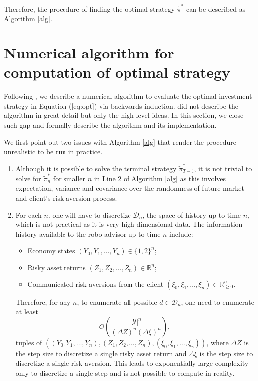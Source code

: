 Therefore, the procedure of finding the optimal strategy $\tilde\pi^*$ can be described as Algorithm \ref{alg}.

\section{Numerical algorithm for computation of optimal strategy}\label{sec:comp}
Following , we describe a numerical algorithm to evaluate the optimal investment strategy in Equation (\ref{eq:opt}) via backwards induction.  did not describe the algorithm in great detail but only the high-level ideas. In this section, we close such gap and formally describe the algorithm and its implementation.

We first point out two issues with Algorithm \ref{alg} that render the procedure unrealistic to be run in practice. \begin{enumerate}
    \item Although it is possible to solve the terminal strategy $\tilde\pi^*_{T-1}$, it is not trivial to solve for $\tilde\pi_n^*$ for smaller $n$ in Line 2 of Algorithm \ref{alg} as this involves expectation, variance and covariance over the randomness of future market and client's risk aversion process.
    \item For each $n$, one will have to discretize $\mathcal D_n$, the space of history up to time $n$, which is not practical as it is very high dimensional data. The information history available to the robo-advisor up to time $n$ include:\begin{itemize}
        \item Economy states $(Y_0,Y_1,\ldots,Y_n)\in\{1,2\}^n$;
        \item Risky asset returns $(Z_1,Z_2,\ldots,Z_n)\in\mathbb{R}^n$;
        \item Communicated risk aversions from the client $(\xi_0,\xi_1,\ldots,\xi_n)\in\mathbb{R}_{\geq0}^n$.
    \end{itemize} Therefore, for any $n$, to enumerate all possible $d\in\mathcal D_n$, one need to enumerate at least \begin{equation}\label{eq:highdim}
        O\left(\frac{|\mathcal Y|^n}{(\Delta Z)^n(\Delta\xi)^n}\right),
    \end{equation}tuples of $((Y_0,Y_1,\ldots,Y_n), (Z_1,Z_2,\ldots,Z_n), (\xi_0,\xi_1,\ldots,\xi_n))$, where $\Delta Z$ is the step size to discretize a single risky asset return and $\Delta\xi$ is the step size to discretize a single risk aversion. This leads to exponentially large complexity only to discretize a single step and is not possible to compute in reality.
\end{enumerate}

